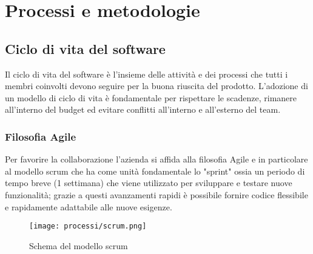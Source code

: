 \chapter{Processi e metodologie}
\label{cap:processi-metodologie}



\section{Ciclo di vita del software}
Il ciclo di vita del software è l'insieme delle attività e dei processi che tutti i membri coinvolti devono seguire per la buona riuscita del prodotto.
L'adozione di un modello di ciclo di vita è fondamentale per rispettare le scadenze, rimanere all'interno del budget ed evitare conflitti all'interno e all'esterno del team.

\subsection{Filosofia Agile}
Per favorire la collaborazione l'azienda si affida alla filosofia Agile e in particolare al modello scrum che ha come unità fondamentale lo "sprint" ossia un periodo di tempo breve (1 settimana) che viene utilizzato per sviluppare e testare nuove funzionalità; grazie a questi avanzamenti rapidi è possibile fornire codice flessibile e rapidamente adattabile alle nuove esigenze. 

\begin{figure}[!h] 
    \centering 
    \texttt{[image: processi/scrum.png]} 
    \caption{Schema del modello scrum}
  \end{figure}
  
